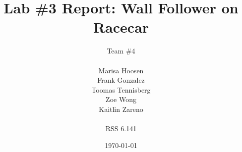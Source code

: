 \documentclass{article}
\title{Lab \#3 Report: Wall Follower on Racecar} %
\author{Team \#4 \\\\ Marisa Hoosen \\ Frank Gonzalez \\ Toomas Tennisberg \\ Zoe Wong \\ Kaitlin Zareno \\\\ RSS 6.141} %
\date{\today} %
\begin{document}
\maketitle

\end{document}
